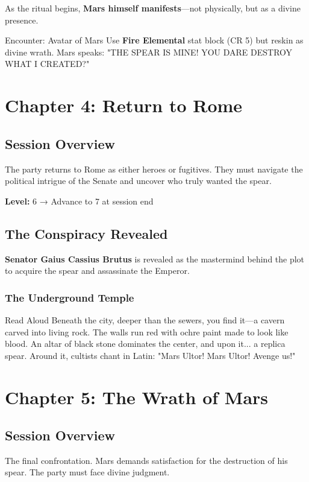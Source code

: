 \documentclass[letterpaper,oneside,twocolumn,openany]{dndbook}
\begin{document}
As the ritual begins, \textbf{Mars himself manifests}—not physically, but as a divine presence.

\begin{commentbox}{Encounter: Avatar of Mars}
Use \textbf{Fire Elemental} stat block (CR 5) but reskin as divine wrath. Mars speaks: "THE SPEAR IS MINE! YOU DARE DESTROY WHAT I CREATED?"
\end{commentbox}

\chapter{Chapter 4: Return to Rome}

\section{Session Overview}
The party returns to Rome as either heroes or fugitives. They must navigate the political intrigue of the Senate and uncover who truly wanted the spear.

\textbf{Level:} 6 → Advance to 7 at session end

\section{The Conspiracy Revealed}

\textbf{Senator Gaius Cassius Brutus} is revealed as the mastermind behind the plot to acquire the spear and assassinate the Emperor.

\subsection{The Underground Temple}

\begin{paperbox}{Read Aloud}
Beneath the city, deeper than the sewers, you find it—a cavern carved into living rock. The walls run red with ochre paint made to look like blood. An altar of black stone dominates the center, and upon it... a replica spear. Around it, cultists chant in Latin: "Mars Ultor! Mars Ultor! Avenge us!"
\end{paperbox}

\chapter{Chapter 5: The Wrath of Mars}

\section{Session Overview}
The final confrontation. Mars demands satisfaction for the destruction of his spear. The party must face divine judgment.
\end{document}
